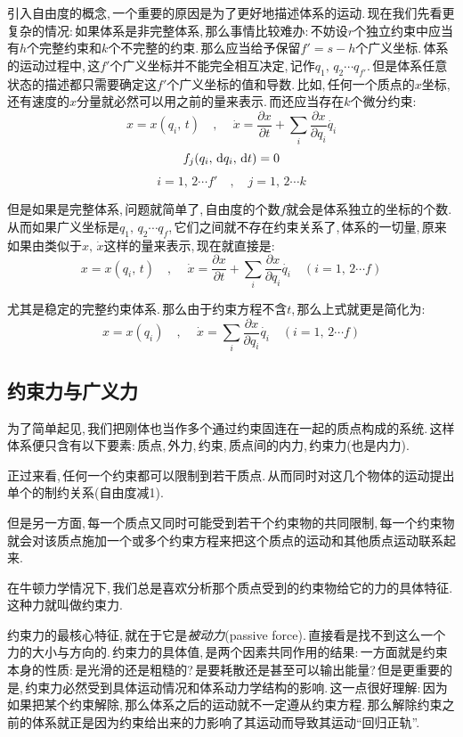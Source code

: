 引入自由度的概念,\,一个重要的原因是为了更好地描述体系的运动.\,现在我们先看更复杂的情况:\,如果体系是非完整体系,\,那么事情比较难办:\,不妨设$r$个独立约束中应当有$h$个完整约束和$k$个不完整的约束.\,那么应当给予保留$f'=s-h$个广义坐标.\,体系的运动过程中,\,这$f'$个广义坐标并不能完全相互决定,\,记作$q_1,\,q_2\cdots q_{f'}$.\,但是体系任意状态的描述都只需要确定这$f'$个广义坐标的值和导数.\,比如,\,任何一个质点的$x$坐标,\,还有速度的$x$分量就必然可以用之前的量来表示.\,而还应当存在$k$个微分约束:
\[x=x(q_i,\,t)\quad,\,\quad \dot{x}=\frac{\partial x}{\partial t}+\sum_i \frac{\partial x}{\partial q_i}\dot{q_i}\]
\[f_j(q_i,\,\textrm{d} q_i,\,\textrm{d} t)=0\]
\[i=1,\,2\cdots f' \quad,\quad j=1,\,2\cdots k\]

但是如果是完整体系,\,问题就简单了,\,自由度的个数$f$就会是体系独立的坐标的个数.\,从而如果广义坐标是$q_1,\,q_2\cdots q_f$,\,它们之间就不存在约束关系了,\,体系的一切量,\,原来如果由类似于$x,\,\dot{x}$这样的量来表示,\,现在就直接是:
\[x=x(q_i,\,t)\quad,\,\quad \dot{x}=\frac{\partial x}{\partial t}+\sum_i \frac{\partial x}{\partial q_i}\dot{q_i}\quad (i=1,\,2\cdots f)\]

尤其是稳定的完整约束体系.\,那么由于约束方程不含$t$,\,那么上式就更是简化为:
\[x=x(q_i)\quad,\,\quad \dot{x}=\sum_i \frac{\partial x}{\partial q_i}\dot{q_i}\quad (i=1,\,2\cdots f)\]



\subsection{约束力与广义力}

为了简单起见,\,我们把刚体也当作多个通过约束固连在一起的质点构成的系统.\,这样体系便只含有以下要素:\,质点,\,外力,\,约束,\,质点间的内力,\,约束力(也是内力).

正过来看,\,任何一个约束都可以限制到若干质点.\,从而同时对这几个物体的运动提出单个的制约关系(自由度减1).

但是另一方面,\,每一个质点又同时可能受到若干个约束物的共同限制,\,每一个约束物就会对该质点施加一个或多个约束方程来把这个质点的运动和其他质点运动联系起来.

在牛顿力学情况下,\,我们总是喜欢分析那个质点受到的约束物给它的力的具体特征.\,这种力就叫做约束力.

约束力的最核心特征,\,就在于它是\emph{被动力}(passive force).\,直接看是找不到这么一个力的大小与方向的.\,约束力的具体值,\,是两个因素共同作用的结果:\,一方面就是约束本身的性质:\,是光滑的还是粗糙的?\,是要耗散还是甚至可以输出能量?\,但是更重要的是,\,约束力必然受到具体运动情况和体系动力学结构的影响.\,这一点很好理解:\,因为如果把某个约束解除,\,那么体系之后的运动就不一定遵从约束方程.\,那么解除约束之前的体系就正是因为约束给出来的力影响了其运动而导致其运动``回归正轨''.

